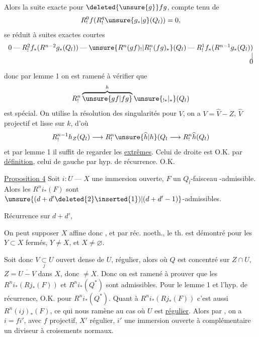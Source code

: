 Alors la suite exacte pour \(\deleted{\unsure{g}}fg\),
compte tenu de
\[
R^0_!f(R^q_!\unsure{g_*|g}(Q_l))=0,
\]
se réduit à  suites exactes courtes
\[
\begin{array}{l}
0\mathbin{\text{---}} R^2_!f_*(R^{n-2}g_*(Q_l))
\mathbin{\text{---}}\unsure{R^n(gf)_!|R^n_!(fg)_*}(Q_l)
\mathbin{\text{---}}R^1_!f_*(R^{n-1}g_*(Q_l))\\
\hfill\mathbin{|}\\[-4pt]
\hfill0
\end{array}
\]
donc par lemme 1 on est ramené à vérifier que
\[
R^n_!\overbrace{\unsure{gf|fg}}^{h}\unsure{_{!*}|_*}(Q_l)
\]
est spécial.
On utilise la résolution des singularités pour \(V\),
on a \(V=\widehat V-Z\), \(\widehat V\) projectif et lisse sur \(k\), d'où
\[
R^{n-1}_!h_Z(Q_l)\longrightarrow
R^n_!\unsure{\widehat h|h}(Q_l\longrightarrow
R^n_!\widehat h(Q_l)
\]
et  par lemme 1 il suffit de regarder les \uline{extrêmes}.
Celui de droite est O.K.  par \uline{définition},
celui de gauche par hyp. de récurrence. O.K.

\uline{Proposition 4}\quad
Soit \(i:U\mathbin{\text{---}}X\) une immersion ouverte,
\(F\) un  \(Q_l\)-faisceau
-admissible.
Alors les \(R^ni_*(F)\) sont
\(\unsure{(d+d'\deleted{2}\inserted{1})|(d+d'-1)}\)-admissibles.

Récurrence sur \(d+d'\),

On peut supposer \(X\) affine donc ,
et par réc. noeth.,  le th. est démontré pour les
\(Y\subset X\) fermés, \(Y\ne X\), et \(X\ne\varnothing\).

Soit donc \(V\underset{j}{\subset}U\) ouvert dense de \(U\), régulier, alors
où \(Q\) est concentré sur \(Z\cap U\),
\(Z=\overline{U-V}\) \uline{} dans \(X\), donc \(\ne X\).
Donc on est ramené à prouver que les
\(R^ni_*(Rj_*(F))\) et \(R^ni_*(Q^*)\) sont admissibles.
Pour le
lemme 1 et l'hyp. de récurrence,
O.K. pour \(R^ni_*(Q^*)\).
Quant à \(R^ni_*(Rj_*(F))\)
c'est aussi \(R^n(ij)_*(F)\), ce qui nous ramène au cas où \(U\) est \uline{régulier}.
Alors par , on a \(i=fi'\),
avec \(f\) projectif, \(X'\) régulier, \(i'\) une immersion ouverte à complémentaire
un diviseur à croisements normaux.

